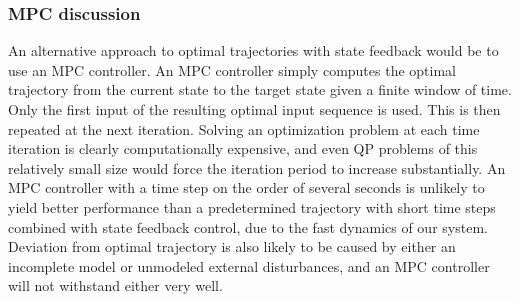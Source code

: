 \subsubsection{MPC discussion}

An alternative approach to optimal trajectories with state feedback would be to use an MPC controller. An MPC controller simply computes the optimal trajectory from the current state to the target state given a finite window of time. Only the first input of the resulting optimal input sequence is used. This is then repeated at the next iteration. Solving an optimization problem at each time iteration is clearly computationally expensive, and even QP problems of this relatively small size would force the iteration period to increase substantially. An MPC controller with a time step on the order of several seconds is unlikely to yield better performance than a predetermined trajectory with short time steps combined with state feedback control, due to the fast dynamics of our system. Deviation from optimal trajectory is also likely to be caused by either an incomplete model or unmodeled external disturbances, and an MPC controller will not withstand either very well. 








